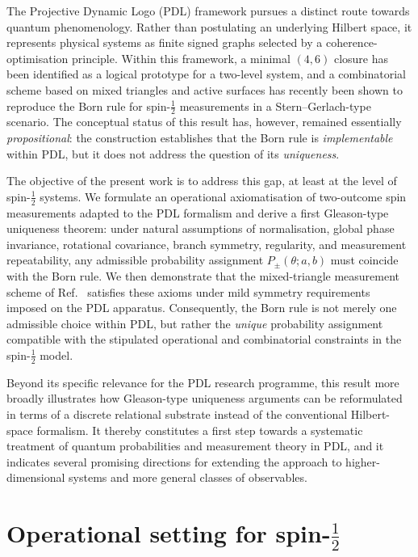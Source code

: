 \documentclass[11pt,a4paper]{article}
\numberwithin{equation}{section}
\theoremstyle{definition}
\begin{document}
The Projective Dynamic Logo (PDL) framework pursues a distinct route towards quantum phenomenology. Rather than postulating an underlying Hilbert space, it represents physical systems as finite signed graphs selected by a coherence-optimisation principle.\cite{LaubscherIntroPDL2026,LaubscherLDP2026} Within this framework, a minimal $(4,6)$ closure has been identified as a logical prototype for a two-level system, and a combinatorial scheme based on mixed triangles and active surfaces has recently been shown to reproduce the Born rule for spin-$\tfrac12$ measurements in a Stern--Gerlach-type scenario.\cite{LaubscherBornPDL2026} The conceptual status of this result has, however, remained essentially \emph{propositional}: the construction establishes that the Born rule is \emph{implementable} within PDL, but it does not address the question of its \emph{uniqueness}.

The objective of the present work is to address this gap, at least at the level of spin-$\tfrac12$ systems. We formulate an operational axiomatisation of two-outcome spin measurements adapted to the PDL formalism and derive a first Gleason-type uniqueness theorem: under natural assumptions of normalisation, global phase invariance, rotational covariance, branch symmetry, regularity, and measurement repeatability, any admissible probability assignment $P_\pm(\theta;a,b)$ must coincide with the Born rule. We then demonstrate that the mixed-triangle measurement scheme of Ref.~\cite{LaubscherBornPDL2026} satisfies these axioms under mild symmetry requirements imposed on the PDL apparatus. Consequently, the Born rule is not merely one admissible choice within PDL, but rather the \emph{unique} probability assignment compatible with the stipulated operational and combinatorial constraints in the spin-$\tfrac12$ model.

Beyond its specific relevance for the PDL research programme, this result more broadly illustrates how Gleason-type uniqueness arguments can be reformulated in terms of a discrete relational substrate instead of the conventional Hilbert-space formalism. It thereby constitutes a first step towards a systematic treatment of quantum probabilities and measurement theory in PDL, and it indicates several promising directions for extending the approach to higher-dimensional systems and more general classes of observables.

\section[Operational setting for spin-1/2]{Operational setting for spin-$\tfrac{1}{2}$}
\label{sec:operational-setting}
\end{document}
